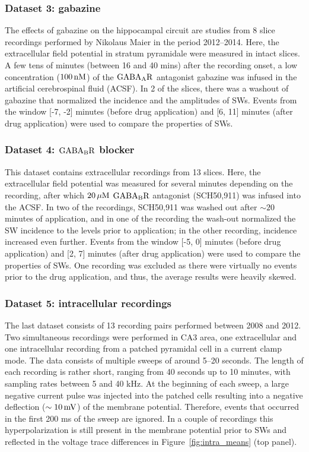     \subsubsection{Dataset 3: gabazine}
      The effects of gabazine on the hippocampal circuit are studies from 8
      slice recordings performed by Nikolaus Maier in the period 2012--2014.
      Here, the extracellular field potential in stratum pyramidale were
      measured in intact slices. A few tens of minutes (between 16 and 40 mins)
      after the recording onset, a low concentration ($100\,\rm nM$) of the
      $\rm GABA_AR$ antagonist gabazine was infused in the artificial
      cerebrospinal fluid (ACSF). In 2 of the slices, there was a washout of
      gabazine that normalized the incidence and the amplitudes of SWs. Events
      from the window [-7, -2] minutes (before drug application) and [6, 11]
      minutes (after drug application) were used to compare the properties of
      SWs.
      
    \subsubsection{Dataset 4: $\rm GABA_B R$ blocker}
      This dataset contains extracellular recordings from 13 slices. Here, the
      extracellular field potential was measured for several minutes depending
      on the recording, after which $20\, \rm \mu M$ ${\rm GABA_BR}$ antagonist
      (SCH50,911) was infused into the ACSF. In two of the recordings,
      SCH50,911 was washed out after $\sim 20$ minutes of application, and in
      one of the recording the wash-out normalized the SW incidence to the
      levels prior to application; in the other recording, incidence increased
      even further.  Events from the window [-5, 0] minutes (before drug
      application) and [2, 7] minutes (after drug application) were used to
      compare the properties of SWs. One recording was excluded as there were
      virtually no events prior to the drug application, and thus, the average
      results were heavily skewed. 

    \subsubsection{Dataset 5: intracellular recordings}
      The last dataset consists of 13 recording pairs performed between 2008
      and 2012. Two simultaneous recordings were performed in CA3 area, one
      extracellular and one intracellular recording from a patched pyramidal
      cell in a current clamp mode. The data consists of multiple sweeps of
      around 5--20 seconds. The length of each recording is rather short,
      ranging from 40 seconds up to 10 minutes, with sampling rates between 5
      and 40 kHz. At the beginning of each sweep, a large negative current
      pulse was injected into the patched cells resulting into a negative
      deflection ($\sim 10\, \rm mV$) of the membrane potential. Therefore,
      events that occurred in the first 200 ms of the sweep are ignored. In a
      couple of recordings this hyperpolarization is still present in the
      membrane potential prior to SWs and reflected in the voltage trace
      differences in Figure~\ref{fig:intra_means} (top panel).

